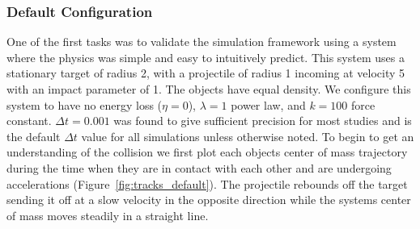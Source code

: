 \documentclass[aps,prl,floatfix,preprint,nofootinbib]{revtex4}
\begin{document}
\subsubsection{Default Configuration}
One of the first tasks was to validate the simulation framework using a system where the physics was simple and easy to intuitively predict. This system uses a stationary target of radius 2, with a projectile of radius 1 incoming at velocity 5 with an impact parameter of 1. The objects have equal density. We configure this system to have no energy loss ($\eta = 0$), $\lambda=1$ power law, and $k=100$ force constant. $\Delta t = 0.001$ was found to give sufficient precision for most studies and is the default $\Delta t$ value for all simulations unless otherwise noted. To begin to get an understanding of the collision we first plot each objects center of mass trajectory during the time when they are in contact with each other and are undergoing accelerations (Figure~\ref{fig:tracks_default}). The projectile rebounds off the target sending it off at a slow velocity in the opposite direction while the systems center of mass moves steadily in a straight line.
\end{document}
